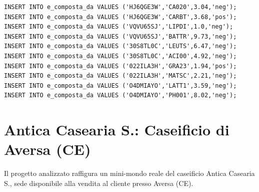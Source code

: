 \documentclass[12pt]{report}
\begin{document}
\begin{scriptsize}
\begin{verbatim}
INSERT INTO e_composta_da VALUES ('HJ6QGE3W','CA020',3.04,'neg');
INSERT INTO e_composta_da VALUES ('HJ6QGE3W','CARBT',3.68,'pos');
INSERT INTO e_composta_da VALUES ('VQVU65SJ','LIPDI',1.0,'neg');
INSERT INTO e_composta_da VALUES ('VQVU65SJ','BATTR',9.73,'neg');
INSERT INTO e_composta_da VALUES ('30S8TL0C','LEUTS',6.47,'neg');
INSERT INTO e_composta_da VALUES ('30S8TL0C','ACI00',4.92,'neg');
INSERT INTO e_composta_da VALUES ('022ILA3H','GRA23',1.94,'pos');
INSERT INTO e_composta_da VALUES ('022ILA3H','MATSC',2.21,'neg');
INSERT INTO e_composta_da VALUES ('O4DMIAYO','LATT1',3.59,'neg');
INSERT INTO e_composta_da VALUES ('O4DMIAYO','PH001',8.02,'neg');
\end{verbatim}
\end{scriptsize}

\chapter{Antica Casearia S.: Caseificio di Aversa (CE)}
Il progetto analizzato raffigura un mini-mondo reale del caseificio Antica Casearia S., sede disponibile alla vendita al cliente presso Aversa (CE). 
\end{document}
